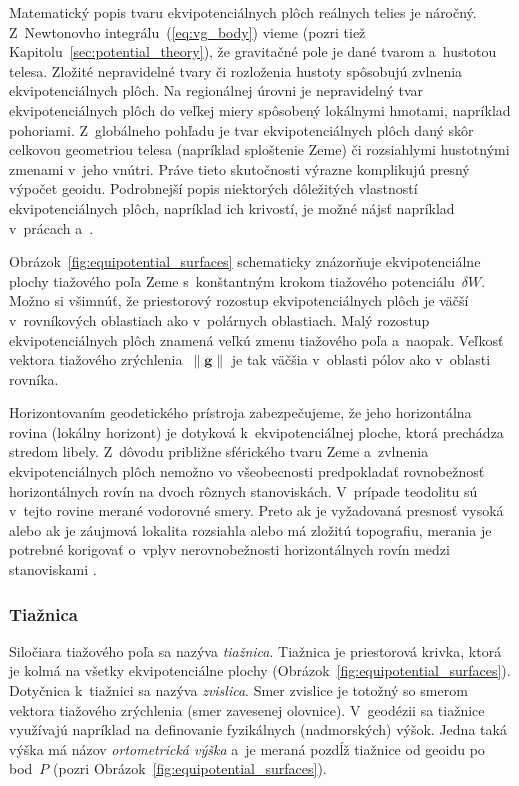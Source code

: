 \documentclass[a4paper, 12pt]{book}
\let\vec\mathbf
\begin{document}
Matematický popis tvaru ekvipotenciálnych plôch reálnych telies je náročný.  
Z~Newtonovho integrálu~(\ref{eq:vg_body}) vieme (pozri tiež 
Kapitolu~\ref{sec:potential_theory}), že gravitačné pole je dané tvarom 
a~hustotou telesa.  Zložité nepravidelné tvary či rozloženia hustoty spôsobujú 
zvlnenia ekvipotenciálnych plôch.  Na regionálnej úrovni je nepravidelný tvar 
ekvipotenciálnych plôch do veľkej miery spôsobený lokálnymi hmotami, napríklad 
pohoriami.  Z~globálneho pohľadu je tvar ekvipotenciálnych plôch daný skôr 
celkovou geometriou telesa (napríklad sploštenie Zeme) či rozsiahlymi 
hustotnými zmenami v~jeho vnútri.  Práve tieto skutočnosti výrazne komplikujú 
presný výpočet geoidu.  Podrobnejší popis niektorých dôležitých vlastností 
ekvipotenciálnych plôch, napríklad ich krivostí, je možné nájsť napríklad 
v~prácach \textcite{MoritzPhysicalGeodesy} a~\textcite{Janak2006}.

Obrázok~\ref{fig:equipotential_surfaces} schematicky znázorňuje ekvipotenciálne
plochy tiažového poľa Zeme s~konštantným krokom tiažového potenciálu~$\delta
W$.  Možno si všimnúť, že priestorový rozostup ekvipotenciálnych plôch je väčší
v~rovníkových oblastiach ako v~polárnych oblastiach.  Malý rozostup
ekvipotenciálnych plôch znamená veľkú zmenu tiažového poľa a~naopak.  Veľkosť
vektora tiažového zrýchlenia~$\| \vec g \|$ je tak väčšia v~oblasti pólov ako
v~oblasti rovníka.

Horizontovaním geodetického prístroja zabezpečujeme, že jeho horizontálna 
rovina (lokálny horizont) je dotyková k~ekvipotenciálnej ploche, ktorá 
prechádza stredom libely.  Z~dôvodu približne sférického tvaru Zeme a~zvlnenia 
ekvipotenciálnych plôch nemožno vo všeobecnosti predpokladať rovnobežnosť 
horizontálnych rovín na dvoch rôznych stanoviskách.  V~prípade teodolitu sú 
v~tejto rovine merané vodorovné smery.  Preto ak je vyžadovaná presnosť vysoká 
alebo ak je záujmová lokalita rozsiahla alebo má zložitú topografiu,  merania 
je potrebné korigovať o~vplyv nerovnobežnosti horizontálnych rovín medzi 
stanoviskami \parencite[pozri napríklad][]{VanicekGeodesy}.

\subsubsection{Tiažnica}
\label{sec:plumbline}

Siločiara tiažového poľa sa nazýva \emph{tiažnica}.  Tiažnica je priestorová 
krivka, ktorá je kolmá na všetky ekvipotenciálne plochy 
(Obrázok~\ref{fig:equipotential_surfaces}).  Dotyčnica k~tiažnici sa nazýva 
\emph{zvislica}.  Smer zvislice je totožný so smerom vektora tiažového 
zrýchlenia (smer zavesenej olovnice).  V~geodézii sa tiažnice využívajú 
napríklad na definovanie fyzikálnych (nadmorských) výšok.  Jedna taká výška má 
názov \emph{ortometrická výška} a~je meraná pozdĺž tiažnice od geoidu po 
bod~$P$ (pozri Obrázok~\ref{fig:equipotential_surfaces}).
\end{document}

